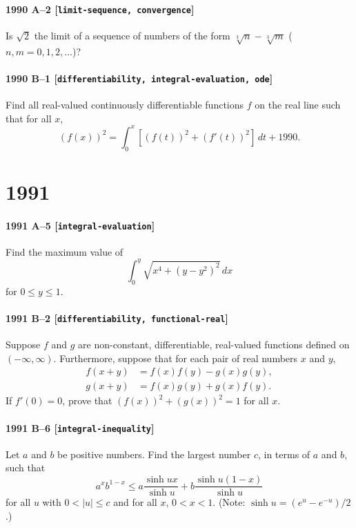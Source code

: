 \documentclass[11pt]{article}
\begin{document}
\paragraph{1990 A--2 \textnormal{[\texttt{limit-sequence, convergence}]}}
Is $\sqrt{2}$ the limit of a sequence of numbers of the form
$\sqrt[3]{n} - \sqrt[3]{m}$ ($n,m = 0, 1, 2, \dots$)?

\paragraph{1990 B--1 \textnormal{[\texttt{differentiability, integral-evaluation, ode}]}}
Find all real-valued continuously differentiable functions $f$
on the real line such that for all $x$,
\[
(f(x))^2 = \int_0^x [(f(t))^2 + (f'(t))^2]\,dt + 1990.
\]

\section*{1991}

\paragraph{1991 A--5 \textnormal{[\texttt{integral-evaluation}]}}
Find the maximum value of
\[
\int_0^y \sqrt{x^4 + (y-y^2)^2}\,dx
\]
for $0 \leq y \leq 1$.

\paragraph{1991 B--2 \textnormal{[\texttt{differentiability, functional-real}]}}
Suppose $f$ and $g$ are non-constant, differentiable, real-valued
functions defined on $(-\infty, \infty)$. Furthermore, suppose that for
each pair of real numbers $x$ and $y$,
\begin{align*}
f(x+y) &= f(x)f(y) - g(x)g(y), \\
g(x+y) &= f(x)g(y) + g(x)f(y).
\end{align*}
If $f'(0) = 0$, prove that $(f(x))^2 + (g(x))^2 = 1$ for all $x$.

\paragraph{1991 B--6 \textnormal{[\texttt{integral-inequality}]}}
Let $a$ and $b$ be positive numbers. Find the largest number $c$, in
terms of $a$ and $b$, such that
\[
a^x b^{1-x} \leq a \frac{\sinh ux}{\sinh u} + b \frac{\sinh u(1-x)}{\sinh u}
\]
for all $u$ with $0 < |u| \leq c$ and for all $x$, $0 < x < 1$. (Note:
$\sinh u = (e^u - e^{-u})/2$.)
\end{document}
